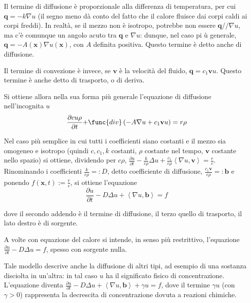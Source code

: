 \documentclass{article}
\begin{document}
Il termine di diffusione \`{e} proporzionale alla differenza di temperatura,
per cui $\mathbf{q}=-k\nabla u$ (il segno meno d\`{a} conto del fatto che il
calore fluisce dai corpi caldi ai corpi freddi). In realt\`{a}, se il mezzo
non \`{e} isotropo, potrebbe non essere $\mathbf{q}//\nabla u$, ma c'\`{e}
comunque un angolo acuto tra $\mathbf{q}$ e $\nabla u$: dunque, nel caso pi%
\`{u} generale, $\mathbf{q}=-A\left( \mathbf{x}\right) \nabla u\left( 
\mathbf{x}\right) $, con $A$ definita positiva. Questo termine \`{e} detto
anche di diffusione.

Il termine di convezione \`{e} invece, se $\mathbf{v}$ \`{e} la velocit\`{a}
del fluido, $\mathbf{q}=c_{1}\mathbf{v}u$. Questo termine \`{e} anche detto
di trasporto, o di deriva.

Si ottiene allora nella sua forma pi\`{u} generale l'equazione di diffusione
nell'incognita $u$%
\begin{equation*}
\frac{\partial cu\rho }{\partial t}\mathbf{+}\func{div}\left( -A\nabla
u+c_{1}\mathbf{v}u\right) =r\rho
\end{equation*}

Nel caso pi\`{u} semplice in cui tutti i coefficienti siano costanti e il
mezzo sia omogeneo e isotropo (quindi $c,c_{1},k$ costanti, $\rho $ costante
nel tempo, $\mathbf{v}$ costante nello spazio) si ottiene, dividendo per $%
c\rho $, $\frac{\partial u}{\partial t}-\frac{k}{c\rho }\Delta u+\frac{c_{1}%
}{c\rho }\left\langle \nabla u,\mathbf{v}\right\rangle =\frac{r}{c}$.
Rinominando i coefficienti $\frac{k}{c\rho }=:D$, detto coefficiente di
diffusione, $\frac{c_{1}\mathbf{v}}{c\rho }=:\mathbf{b}$ e ponendo $f\left( 
\mathbf{x},t\right) :=\frac{r}{c}$, si ottiene l'equazione%
\begin{equation*}
\frac{\partial u}{\partial t}-D\Delta u+\left\langle \nabla u,\mathbf{b}%
\right\rangle =f
\end{equation*}

dove il secondo addendo \`{e} il termine di diffusione, il terzo quello di
trasporto, il lato destro \`{e} di sorgente.

A volte con equazione del calore si intende, in senso pi\`{u} restrittivo,
l'equazione $\frac{\partial u}{\partial t}-D\Delta u=f$, spesso con sorgente
nulla.

Tale modello descrive anche la diffusione di altri tipi, ad esempio di una
sostanza disciolta in un'altra: in tal caso $u$ ha il significato fisico di
concentrazione. L'equazione diventa $\frac{\partial u}{\partial t}-D\Delta
u+\left\langle \nabla u,\mathbf{b}\right\rangle +\gamma u=f$, dove il
termine $\gamma u$ (con $\gamma >0$) rappresenta la decrescita di
concentrazione dovuta a reazioni chimiche.
\end{document}
